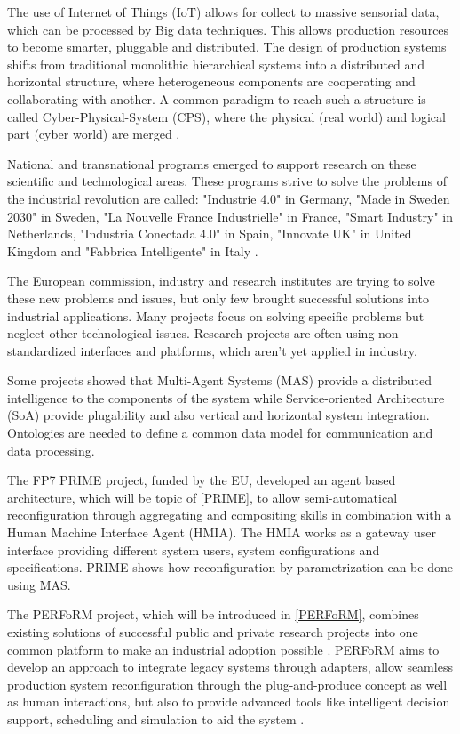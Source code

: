 \documentclass[conference,compsoc,hidelinks]{IEEEtran}
\begin{document}
The use of Internet of Things (IoT) allows for collect to massive sensorial data, which can be processed by Big data techniques. This allows production resources to become smarter, pluggable and distributed. The design of production systems shifts from traditional monolithic hierarchical systems into a distributed and horizontal structure, where heterogeneous components are cooperating and collaborating with another. A common paradigm to reach such a structure is called Cyber-Physical-System (CPS), where the physical (real world) and logical part (cyber world) are merged \cite{SpecPERFoRM}.

National and transnational programs emerged to support research on these scientific and technological areas. These programs strive to solve the problems of the industrial revolution are called: "Industrie 4.0" in Germany, "Made in Sweden 2030" in Sweden, "La Nouvelle France Industrielle" in France, "Smart Industry" in Netherlands, "Industria Conectada 4.0" in Spain, "Innovate UK" in United Kingdom and "Fabbrica Intelligente" in Italy \cite{SpecPERFoRM}. 

The European commission, industry and research institutes are trying to solve these new problems and issues, but only few brought successful solutions into industrial applications. Many projects focus on solving specific problems but neglect other technological issues. Research projects are often using non-standardized interfaces and platforms, which aren't yet applied in industry. 

Some projects showed that Multi-Agent Systems (MAS) provide a distributed intelligence to the components of the system while Service-oriented Architecture (SoA) provide plugability and also vertical and horizontal system integration. Ontologies are needed to define a common data model for communication and data processing.

The FP7 PRIME project, funded by the EU, developed an agent based architecture, which will be topic of \autoref{PRIME}, to allow semi-automatical reconfiguration through aggregating and compositing skills in combination with a Human Machine Interface Agent (HMIA). The HMIA works as a gateway user interface providing different system users, system configurations and specifications. PRIME shows how reconfiguration by parametrization can be done using MAS.

The PERFoRM project, which will be introduced in \autoref{PERFoRM}, combines existing solutions of successful public and private research projects into one common platform to make an industrial adoption possible \cite{HarmonizedSystems}. PERFoRM aims to develop an approach to integrate legacy systems through adapters, allow seamless production system reconfiguration through the plug-and-produce concept as well as human interactions, but also to provide advanced tools like intelligent decision support, scheduling and simulation to aid the system \cite{SpecPERFoRM}.
\end{document}
